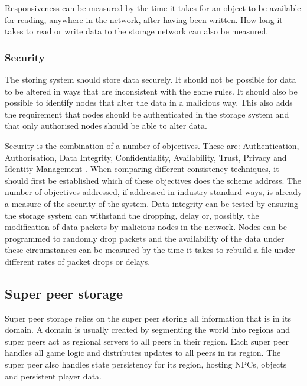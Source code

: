 \documentclass[10pt,a4paper,journal,cspaper,compsoc]{IEEEtran}
\begin{document}
Responsiveness can be measured by the time it takes for an object to be available for reading, anywhere in the network, after having been written.
How long it takes to read or write data to the storage network can also be measured.

\subsubsection{Security}
The storing system should store data securely. It should not be possible for data to be altered in ways that are inconsistent with the game rules. It
should also be possible to identify nodes that alter the data in a malicious way. This also adds the requirement that nodes should be authenticated
in the storage system and that only authorised nodes should be able to alter data.

Security is the combination of a number of objectives. These are: Authentication, Authorisation, Data Integrity, Confidentiality, Availability,
Trust, Privacy and Identity Management \cite{distributed_systems_security}. When comparing different consistency techniques, it should first be
established which of these objectives does the scheme address. The number of objectives addressed, if addressed in industry standard ways, is already
a measure of the security of the system. Data integrity can be tested by ensuring the storage system can withstand the dropping, delay or, possibly,
the modification of data packets by malicious nodes in the network. Nodes can be programmed to randomly drop packets and the availability of the data
under these circumstances can be measured by the time it takes to rebuild a file under different rates of packet drops or delays.

\subsection{Super peer storage}
\label{super_peer_storage}

Super peer storage relies on the super peer storing all information that is in its domain. A domain is usually created by segmenting the world into
regions and super peers act as regional servers to all peers in their region. Each super peer handles all game logic and distributes updates to all
peers in its region. The super peer also handles state persistency for its region, hosting NPCs, objects and persistent player data.
\end{document}

